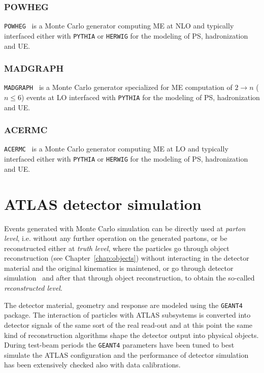 \subsubsection*{POWHEG}

\texttt{POWHEG}~\cite{powheg} is a Monte Carlo generator computing
ME at NLO and typically interfaced either with \texttt{PYTHIA} or 
\texttt{HERWIG} for the modeling of PS, hadronization and UE.


\subsubsection*{MADGRAPH}

\texttt{MADGRAPH}~\cite{madgraph} is a Monte Carlo generator 
specialized for ME computation of $2 \to n$ ($n\leq 6$) events at LO
interfaced with \texttt{PYTHIA} for the modeling of PS, hadronization and UE.


\subsubsection*{ACERMC}

\texttt{ACERMC}~\cite{acermc} is a Monte Carlo generator computing
ME at LO and typically interfaced either with \texttt{PYTHIA} or 
\texttt{HERWIG} for the modeling of PS, hadronization and UE.



\section{ATLAS detector simulation}\label{sec:MCdetector}

Events generated with Monte Carlo simulation can be directly
used at {\it parton level}, i.e. without any further operation on the
generated partons, or be reconstructed either at {\it truth level}, where
the particles go through object reconstruction (see Chapter~\ref{chap:objects})
without interacting in the detector material and the original kinematics is
maintened, or go through detector simulation~\cite{atlas_sim} and after that through object
reconstruction, to obtain the so-called {\it reconstructed level}.

The detector material, geometry and response %
are modeled using the {\tt GEANT4}~\cite{geant} package.
The interaction of particles with ATLAS subsystems is converted
into detector signals of the same sort of the real read-out and
at this point the same kind of reconstruction algorithms shape
the detector output into physical objects. During test-beam periods
the \texttt{GEANT4} parameters have been tuned to best simulate
the ATLAS configuration and the performance of detector simulation
has been extensively checked also with data calibrations.

